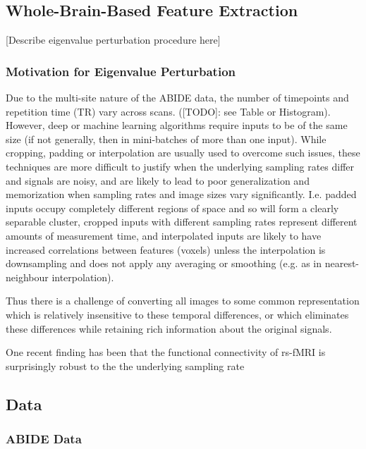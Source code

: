 \documentclass[10pt]{article}
\begin{document}
\subsection{Whole-Brain-Based Feature Extraction}

[Describe eigenvalue perturbation procedure here]

\subsubsection{Motivation for Eigenvalue Perturbation}

Due to the multi-site nature of the ABIDE data, the number of timepoints and repetition time (TR)
vary across scans. ([TODO]: see Table or Histogram). However, deep or machine learning algorithms
require inputs to be of the same size (if not generally, then in mini-batches of more than one
input). While cropping, padding or interpolation are usually used to overcome such issues, these
techniques are more difficult to justify when the underlying sampling rates differ and signals are
noisy, and are likely to lead to poor generalization and memorization when sampling rates and image
sizes vary significantly. I.e. padded inputs occupy completely different regions of space and so
will form a clearly separable cluster, cropped inputs with different sampling rates represent
different amounts of measurement time, and interpolated inputs are likely to have increased
correlations between features (voxels) unless the interpolation is downsampling and does not apply
any averaging or smoothing (e.g. as in nearest-neighbour interpolation).

Thus there is a challenge of converting all images to some common representation which is relatively
insensitive to these temporal differences, or which eliminates these differences while retaining
rich information about the original signals.

One recent finding has been that the functional connectivity of rs-fMRI is surprisingly robust to the
the underlying sampling rate \citep{huotariSamplingRateEffects2019,shakilEvaluationSlidingWindow2016}

\subsection{Data}

\subsubsection{ABIDE Data}
\end{document}
